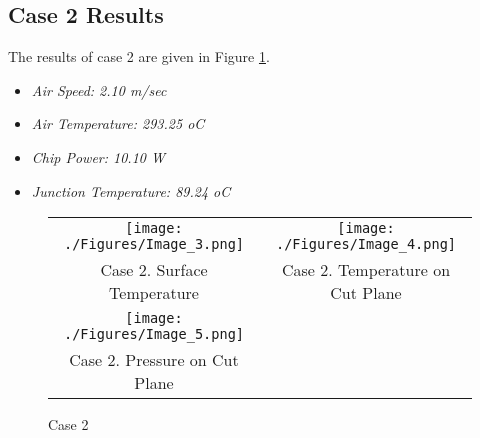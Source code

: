 \documentclass[letterpaper,12pt]{article}
\begin{document}
\subsection{Case 2 Results}
The results of case 2 are given in Figure \ref{fig:case 2}.\\
\begin{itemize}
\item{\emph{Air Speed: 2.10 m/sec}}

\item{\emph{Air Temperature: 293.25 oC}}

\item{\emph{Chip Power: 10.10 W}}

\item{\emph{Junction Temperature: 89.24 oC}}

\end{itemize}
\begin{figure}[!h!tbp]
\begin{center}
\begin{tabular}{ c c }
\texttt{[image: ./Figures/Image\_3.png]}
 & \texttt{[image: ./Figures/Image\_4.png]}
 \\ Case 2. Surface Temperature & Case 2. Temperature on Cut Plane \\
\texttt{[image: ./Figures/Image\_5.png]}
 &  \\ Case 2. Pressure on Cut Plane &  \\
\end{tabular}
\caption{\label{fig:case 2}
Case 2}
\end{center}
\end{figure}
\vfill
\newpage
\clearpage
\end{document}
